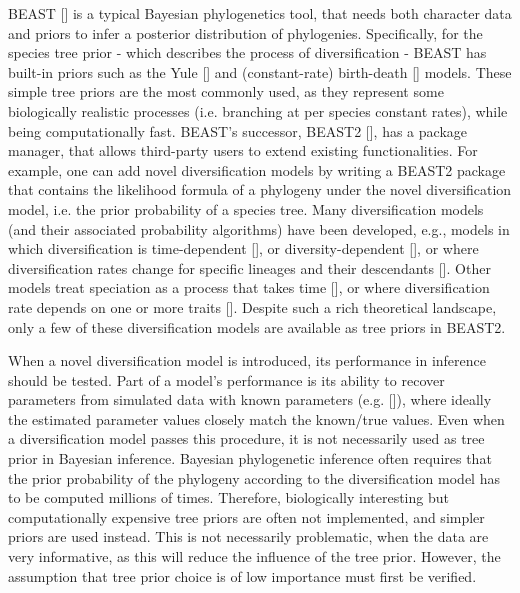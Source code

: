 BEAST [\cite{drummond2007beast}] is a typical Bayesian phylogenetics tool, 
that needs both character data and priors to infer 
a posterior distribution of phylogenies.
Specifically, for the species tree prior - which describes 
the process of diversification - 
BEAST has built-in priors such as the Yule [\cite{yule}] and 
(constant-rate) birth-death [\cite{nee1994reconstructed}] models.
These simple tree priors are the most commonly used, as they represent some biologically realistic processes (i.e. branching at per species constant rates), while being computationally fast.
BEAST's successor, BEAST2 [\cite{bouckaert2019beast}],
has a package manager, that allows third-party users 
to extend existing functionalities.
For example, one can add novel diversification models 
by writing a BEAST2 package that contains the likelihood 
formula of a phylogeny under the novel diversification model, 
i.e. the prior probability of a species tree.
Many diversification models (and their associated probability algorithms) 
have been developed, e.g., models in which diversification is time-dependent [\cite{nee1994reconstructed,rabosky2008explosive}],
or diversity-dependent [\cite{etienne2012diversity}],
or where diversification rates change for specific lineages 
and their descendants [\cite{etienne2012conceptual, rabosky2014automatic, alfaro2009nine}].
Other models treat speciation as a process that takes 
time [\cite{rosindell2010protracted, etienne2012prolonging, lambert2015reconstructed}],
or where diversification rate
depends on one or more traits [\cite{maddison2007estimating, fitzjohn2012diversitree}].
Despite such a rich theoretical landscape, only a few of these 
diversification models are available as tree priors in BEAST2.

When a novel diversification model is introduced,
its performance in inference should be tested.
Part of a model's performance is its ability to recover parameters from simulated data with known 
parameters (e.g. [\cite{etienne2014estimating}]), 
where ideally the estimated parameter values closely match the known/true values.
Even when a diversification model passes this procedure, 
it is not necessarily used as tree prior in Bayesian inference.
Bayesian phylogenetic inference often requires 
that the prior probability of the phylogeny 
according to the diversification model has to be computed millions of times. 
Therefore, biologically interesting but computationally expensive tree priors 
are often not implemented, and simpler priors are used instead. 
This is not necessarily problematic, when the data are very informative, 
as this will reduce the influence of the tree prior.
However, the assumption that tree prior choice is of low importance 
must first be verified.

